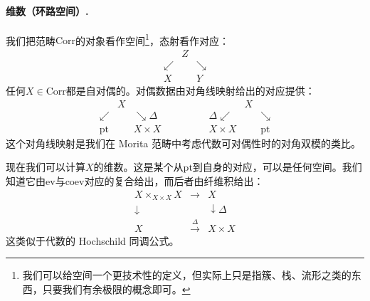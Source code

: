 \paragraph{维数（环路空间）.}
我们把范畴$\mathrm{Corr}$的对象看作空间\footnote{我们可以给空间一个更技术性的定义，但实际上只是指簇、栈、流形之类的东西，只要我们有余极限的概念即可。}，态射看作对应：
\begin{equation}\tag{12.48}
\begin{array}{ccc}
 & Z & \\
 \swarrow & & \searrow\\
 X & & Y
\end{array}
\end{equation}
任何$X\in\mathrm{Corr}$都是自对偶的。对偶数据由对角线映射给出的对应提供：
\begin{equation}\tag{12.49}
\begin{array}{ccc}
 & X & \\
 \swarrow & & \searrow{\scriptstyle \Delta}\\
 \mathrm{pt} & & X\times X
\end{array}
\qquad\qquad
\begin{array}{ccc}
 & X & \\
 \Delta\swarrow & & \searrow\\
 X\times X & & \mathrm{pt}
\end{array}
\end{equation}
这个对角线映射是我们在 Morita 范畴中考虑代数可对偶性时的对角双模的类比。

现在我们可以计算$X$的维数。这是某个从$\mathrm{pt}$到自身的对应，可以是任何空间。我们知道它由$\mathrm{ev}$与$\mathrm{coev}$对应的复合给出，而后者由纤维积给出：
\begin{equation}\tag{12.50}
\begin{array}{ccc}
X\times_{X\times X}X & \longrightarrow & X\\
\downarrow & & \downarrow{\scriptstyle \Delta}\\
X & \xrightarrow{\ \Delta\ } & X\times X
\end{array}
\end{equation}
这类似于代数的 Hochschild 同调公式。

